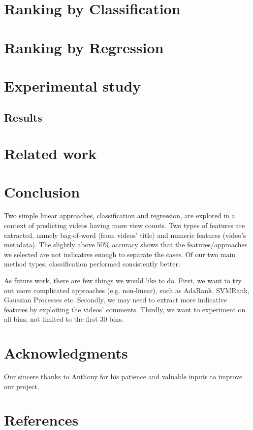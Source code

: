 \documentclass{article} %
\begin{document}
\section{Ranking by Classification}
\label{sec:ranking}
	
\section{Ranking by Regression}
\label{sec:regression}
	
\section{Experimental study}
\label{sec:experiment}
	
\subsection{Results}
\label{sec:results}
	
\section{Related work}
\label{sec:related}
	

\section{Conclusion}
Two simple linear approaches, classification and regression, are explored in a context of predicting videos having more view counts. Two types of features are extracted, namely bag-of-word (from videos' title) and numeric features (video's metadata). The slightly above 50\% accuracy shows that the features/approaches we selected are not indicative enough to separate the cases.  Of our two main method types, classification performed consistently better.

As future work, there are few things we would like to do. First, we want to try out more complicated approaches (e.g. non-linear), such as AdaRank, SVMRank, Gaussian Processes etc. Secondly, we may need to extract more indicative features by exploiting the videos' comments. Thirdly, we want to experiment on all bins, not limited to the first 30 bins.

\section*{Acknowledgments}
	Our sincere thanks to Anthony for his patience and valuable inputs to improve our project.

\section*{References}
\label{sec:references}
	
\end{document}
